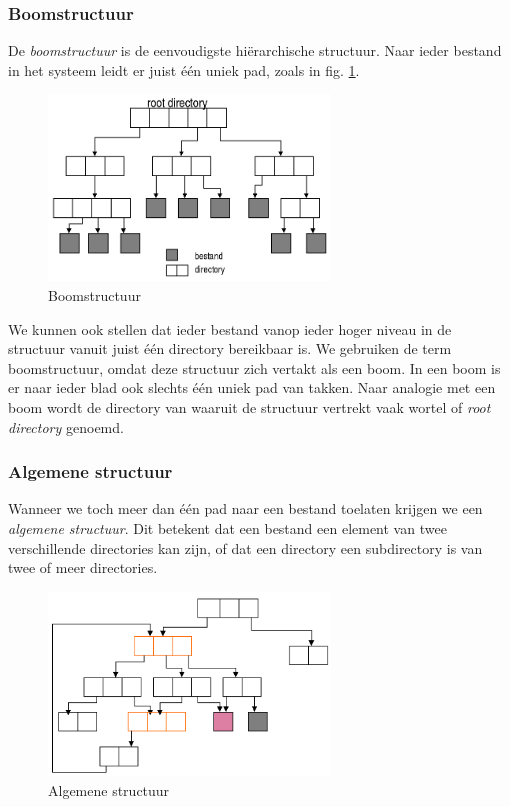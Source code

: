 \subsubsection{Boomstructuur}

De \emph{boomstructuur} is de eenvoudigste
hi\"erarchische structuur. Naar ieder bestand in het systeem leidt er
juist \'e\'en uniek pad, zoals in fig. \ref{boomstructuur}.

\begin{figure}
\begin{center}
\includegraphics[width=75mm]{images/fig0401.png}
\end{center}
\caption{Boomstructuur}
\label{boomstructuur}
\end{figure}

We kunnen ook stellen dat ieder bestand vanop ieder hoger
niveau in de structuur vanuit juist \'e\'en directory bereikbaar is. We
gebruiken de term boomstructuur, omdat deze structuur zich vertakt
als een boom. In een boom is er naar ieder blad ook slechts \'e\'en
uniek pad van takken. Naar analogie met een boom wordt de directory
van waaruit de structuur vertrekt vaak wortel of \emph{root
directory} genoemd.

\subsubsection{Algemene structuur}

Wanneer we toch meer dan \'e\'en pad naar een bestand toelaten
krijgen we een \emph{algemene structuur}. Dit betekent
dat een bestand een element van twee verschillende directories kan
zijn, of dat een directory een subdirectory is van twee of meer
directories.

\begin{figure}
\begin{center}
\includegraphics[width=75mm]{images/fig0402.png}
\end{center}
\caption{Algemene structuur}
\label{algstructuur}
\end{figure}

